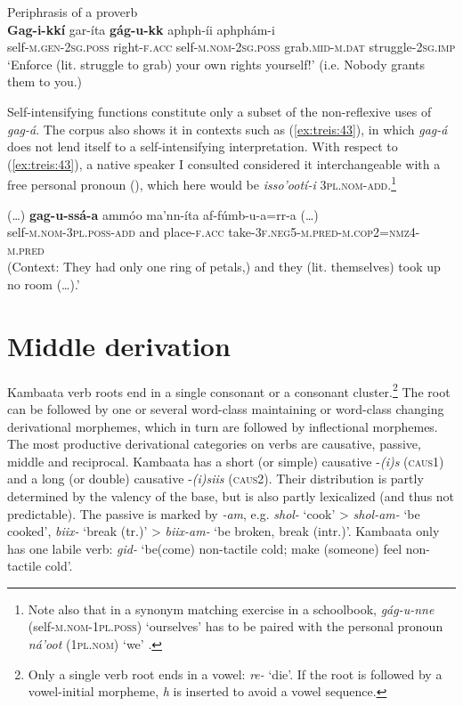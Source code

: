 \documentclass[output=paper]{langscibook}
\begin{document}
\ea\label{ex:treis:42} Periphrasis of a proverb\\
\gll \textbf{Gag-i-kkí} gar-íta \textbf{gág-u-kk} aphph-íi aphphám-i\\
     self-\textsc{m.gen-2sg.poss} right-\textsc{f.acc} self-\textsc{m.nom-2sg.poss} grab.\textsc{mid-m.dat} struggle\textsc{-2sg.imp}\\
\glt ‘Enforce (lit. struggle to grab) your own rights yourself!’ (i.e. Nobody grants them to you.) \citep[138]{AlamuAlamaayo2017}\z

Self-intensifying functions constitute only a subset of the non-reflexive uses of \textit{gag-á}. The corpus also shows it in contexts such as (\ref{ex:treis:43}), in which \textit{gag-á} does not lend itself to a self-intensifying interpretation. With respect to (\ref{ex:treis:43}), a native speaker I consulted considered it interchangeable with a free personal pronoun (), which here would be \textit{isso’ootí-i} \textsc{3pl.nom-add.}\footnote{Note also that in a synonym matching exercise in a schoolbook, \textit{gág-u-nne} (self-\textsc{m.nom-1pl.poss)} ‘ourselves’ has to be paired with the personal pronoun \textit{ná’oot} (1\textsc{pl.nom)} ‘we’ \citep[4.122]{KEB1989}.}

\ea\label{ex:treis:43}
\gll (…) \textbf{gag-u-ssá-a} ammóo ma’nn-íta {af-fúmb-u-a=rr-a (…)}\\
     {} self-\textsc{m.nom-3pl.poss-add} and place-\textsc{f.acc} take-\textsc{3f.neg5-m.pred-m.cop2=nmz4-m.pred}\\
\glt (Context: They had only one ring of petals,) and they (lit. themselves) took up no room (…).’ \citep[30]{Saint-Exupéry2018}\z

\section{Middle derivation}\label{sec:treis:4}

Kambaata verb roots end in a single consonant or a consonant cluster.\footnote{Only a single verb root ends in a vowel: \textit{re-} ‘die’. If the root is followed by a vowel-initial morpheme, \textit{h} is inserted to avoid a vowel sequence.} The root can be followed by one or several word-class maintaining or word-class changing derivational morphemes, which in turn are followed by inflectional morphemes. The most productive derivational categories on verbs are causative, passive, middle and reciprocal. Kambaata has a short (or simple) causative -\textit{(i)s} (\textsc{caus1)} and a long (or double) causative -\textit{(i)siis} (\textsc{caus2).} Their distribution is partly determined by the valency of the base, but is also partly lexicalized (and thus not predictable). The passive is marked by \textit{-am}, e.g. \textit{shol-} ‘cook’ > \textit{shol-am-} ‘be cooked’, \textit{biix-} ‘break (tr.)’ > \textit{biix-am-} ‘be broken, break (intr.)’. Kambaata only has one labile verb: \textit{gid-} ‘be(come) non-tactile cold; make (someone) feel non-tactile cold’.
\end{document}
